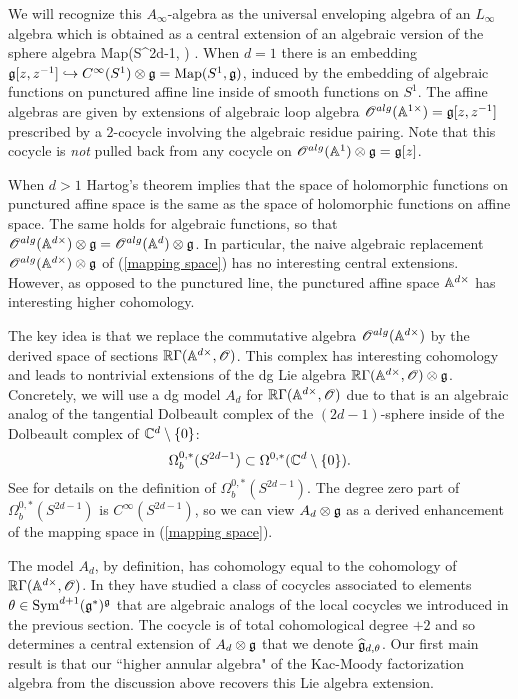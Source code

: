 
We will recognize this $A_\infty$-algebra as the universal enveloping algebra of an $L_\infty$ algebra which is obtained as a central extension of an algebraic version of the sphere algebra
\beqn\label{mapping space}
{\rm Map}(S^{2d-1}, \fg) .
\eeqn
When $d=1$ there is an embedding $\fg[z,z^{-1}] \hookrightarrow C^\infty(S^1) \tensor \fg = {\rm Map}(S^1, \fg)$, induced by the embedding of algebraic functions on punctured affine line inside of smooth functions on $S^1$. 
The affine algebras are given by extensions of algebraic loop algebra $\sO^{alg}(\AA^{1\times}) = \fg[z,z^{-1}]$ prescribed by a $2$-cocycle involving the algebraic residue pairing. 
Note that this cocycle is {\em not} pulled back from any cocycle on $\sO^{alg}(\AA^1) \tensor \fg = \fg[z]$. 

When $d > 1$ Hartog's theorem implies that the space of holomorphic functions on punctured affine space is the same as the space of holomorphic functions on affine space.
The same holds for algebraic functions, so that $\sO^{alg}(\AA^{d\times}) \tensor \fg = \sO^{alg}(\AA^d) \tensor \fg$. 
In particular, the naive algebraic replacement $\sO^{alg}(\AA^{d\times}) \tensor \fg$ of (\ref{mapping space}) has no interesting central extensions. 
However, as opposed to the punctured line, the punctured affine space $\AA^{d \times}$ has interesting higher cohomology. 

The key idea is that we replace the commutative algebra $\sO^{alg}(\AA^{d\times})$ by the derived space of sections $\RR \Gamma(\AA^{d \times}, \sO)$. 
This complex has interesting cohomology and leads to nontrivial extensions of the dg Lie algebra $\RR \Gamma(\AA^{d \times}, \sO) \tensor \fg$. 
Concretely, we will use a dg model $A_d$ for $\RR \Gamma(\AA^{d \times}, \sO)$ due to \cite{FHK} that is an algebraic analog of the tangential Dolbeault complex of the $(2d-1)$-sphere inside of the Dolbeault complex of $\CC^d \setminus \{0\}$:
\[
\Omega_b^{0,*}(S^{2d-1}) \subset \Omega^{0,*}(\CC^d\setminus \{0\}) .
\]
See \cite{DragomirTomassini} for details on the definition of $\Omega_b^{0,*}(S^{2d-1})$. 
The degree zero part of $\Omega_b^{0,*}(S^{2d-1})$ is $C^\infty(S^{2d-1})$, so we can view $A_d \tensor \fg$ as a derived enhancement of the mapping space in (\ref{mapping space}). 

The model $A_d$, by definition, has cohomology equal to the cohomology of $\RR \Gamma(\AA^{d \times}, \sO)$. 
In \cite{FHK} they have studied a class of cocycles associated to elements $\theta \in \Sym^{d+1}(\fg^*)^\fg$ that are algebraic analogs of the local cocycles we introduced in the previous section. 
The cocycle is of total cohomological degree $+2$ and so determines a central extension of $A_d \tensor \fg$ that we denote $\Hat{\fg}_{d,\theta}$. 
Our first main result is that our ``higher annular algebra" of the Kac-Moody factorization algebra from the discussion above recovers this Lie algebra extension.

